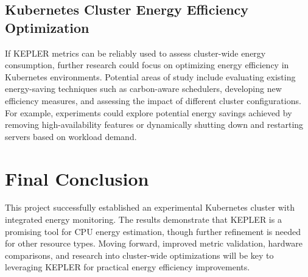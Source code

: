 \subsection{Kubernetes Cluster Energy Efficiency Optimization}

If KEPLER metrics can be reliably used to assess cluster-wide energy consumption, further research could focus on optimizing energy efficiency in Kubernetes environments. Potential areas of study include evaluating existing energy-saving techniques such as carbon-aware schedulers, developing new efficiency measures, and assessing the impact of different cluster configurations. For example, experiments could explore potential energy savings achieved by removing high-availability features or dynamically shutting down and restarting servers based on workload demand.

\section{Final Conclusion}

This project successfully established an experimental Kubernetes cluster with integrated energy monitoring. The results demonstrate that KEPLER is a promising tool for CPU energy estimation, though further refinement is needed for other resource types. Moving forward, improved metric validation, hardware comparisons, and research into cluster-wide optimizations will be key to leveraging KEPLER for practical energy efficiency improvements.